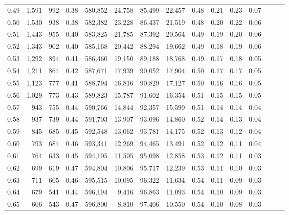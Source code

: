 \begin{tabular}{rrrrrrrrrrrrrrr}
0.49 &   1,591 &    992 &  0.38 &  580,852 &   24,758 &   85,499 &   22,457 &  0.48 &  0.21 &  0.23 &      0.07 \\
0.50 &   1,530 &    938 &  0.38 &  582,382 &   23,228 &   86,437 &   21,519 &  0.48 &  0.20 &  0.22 &      0.06 \\
0.51 &   1,443 &    955 &  0.40 &  583,825 &   21,785 &   87,392 &   20,564 &  0.49 &  0.19 &  0.20 &      0.06 \\
0.52 &   1,343 &    902 &  0.40 &  585,168 &   20,442 &   88,294 &   19,662 &  0.49 &  0.18 &  0.19 &      0.06 \\
0.53 &   1,292 &    894 &  0.41 &  586,460 &   19,150 &   89,188 &   18,768 &  0.49 &  0.17 &  0.18 &      0.05 \\
0.54 &   1,211 &    864 &  0.42 &  587,671 &   17,939 &   90,052 &   17,904 &  0.50 &  0.17 &  0.17 &      0.05 \\
0.55 &   1,123 &    777 &  0.41 &  588,794 &   16,816 &   90,829 &   17,127 &  0.50 &  0.16 &  0.16 &      0.05 \\
0.56 &   1,029 &    773 &  0.43 &  589,823 &   15,787 &   91,602 &   16,354 &  0.51 &  0.15 &  0.15 &      0.05 \\
0.57 &     943 &    755 &  0.44 &  590,766 &   14,844 &   92,357 &   15,599 &  0.51 &  0.14 &  0.14 &      0.04 \\
0.58 &     937 &    739 &  0.44 &  591,703 &   13,907 &   93,096 &   14,860 &  0.52 &  0.14 &  0.13 &      0.04 \\
0.59 &     845 &    685 &  0.45 &  592,548 &   13,062 &   93,781 &   14,175 &  0.52 &  0.13 &  0.12 &      0.04 \\
0.60 &     793 &    684 &  0.46 &  593,341 &   12,269 &   94,465 &   13,491 &  0.52 &  0.12 &  0.11 &      0.04 \\
0.61 &     764 &    633 &  0.45 &  594,105 &   11,505 &   95,098 &   12,858 &  0.53 &  0.12 &  0.11 &      0.03 \\
0.62 &     699 &    619 &  0.47 &  594,804 &   10,806 &   95,717 &   12,239 &  0.53 &  0.11 &  0.10 &      0.03 \\
0.63 &     711 &    605 &  0.46 &  595,515 &   10,095 &   96,322 &   11,634 &  0.54 &  0.11 &  0.09 &      0.03 \\
0.64 &     679 &    541 &  0.44 &  596,194 &    9,416 &   96,863 &   11,093 &  0.54 &  0.10 &  0.09 &      0.03 \\
0.65 &     606 &    543 &  0.47 &  596,800 &    8,810 &   97,406 &   10,550 &  0.54 &  0.10 &  0.08 &      0.03 \\

\end{tabular}
